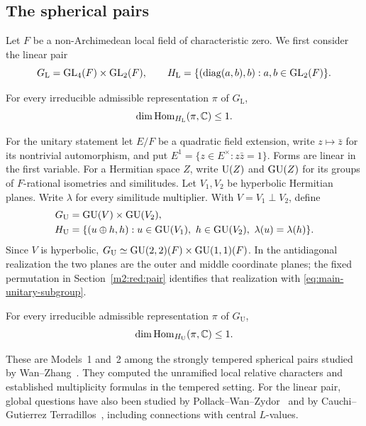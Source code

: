 

\subsection{The spherical pairs}
Let $F$ be a non-Archimedean local field of characteristic zero.
We first consider the linear pair
\begin{equation}\label{eq:main-linear-subgroup}
 G_{\mathrm L}=\operatorname{GL}_4(F)\times\operatorname{GL}_2(F),\qquad
 H_{\mathrm L}=\{(\operatorname{diag}(a,b),b):a,b\in\operatorname{GL}_2(F)\}.
\end{equation}
\begin{mainthm}\label{thm:main-linear}\label{m1:thm:main}
For every irreducible admissible representation $\pi$ of $G_{\mathrm L}$,
\[
 \dim\operatorname{Hom}_{H_{\mathrm L}}(\pi,\mathbb C)\leq1.
\]
\end{mainthm}

For the unitary statement let $E/F$ be a quadratic field extension,
write $z\mapsto\bar z$ for its nontrivial automorphism, and put
$E^1=\{z\in E^\times:z\bar z=1\}$. Forms are linear in the first
variable. For a Hermitian space $Z$, write $\operatorname{U}(Z)$ and $\operatorname{GU}(Z)$
for its groups of $F$-rational isometries and similitudes.
Let $V_1,V_2$ be hyperbolic Hermitian planes. Write $\lambda$ for
every similitude multiplier. With $V=V_1\perp V_2$, define
\begin{equation}\label{eq:main-unitary-subgroup}
 \begin{split}
 G_{\mathrm U}&=\operatorname{GU}(V)\times\operatorname{GU}(V_2),\\
 H_{\mathrm U}&=\{(u\oplus h,h):u\in\operatorname{GU}(V_1),\ h\in\operatorname{GU}(V_2),
                              \ \lambda(u)=\lambda(h)\}.
 \end{split}
\end{equation}
Since $V$ is hyperbolic,
$G_{\mathrm U}\simeq\operatorname{GU}(2,2)(F)\times\operatorname{GU}(1,1)(F)$.
In the antidiagonal realization the two planes are the outer and middle
coordinate planes; the fixed permutation in
Section~\ref{m2:red:pair} identifies that realization with
\eqref{eq:main-unitary-subgroup}.
\begin{mainthm}\label{thm:main-unitary}\label{m2:thm:main}
For every irreducible admissible representation $\pi$ of $G_{\mathrm U}$,
\[
 \dim\operatorname{Hom}_{H_{\mathrm U}}(\pi,\mathbb C)\leq1.
\]
\end{mainthm}
These are Models~1 and~2 among the strongly tempered spherical pairs
studied by Wan--Zhang~\cite{WanZhang25}. They computed the unramified local relative characters and established multiplicity formulas in the tempered setting. For the linear pair, global questions have also been
studied by Pollack--Wan--Zydor~\cite{PWZ21} and by
Cauchi--Gutierrez Terradillos~\cite{CGTLinear}, including connections
with central $L$-values.

